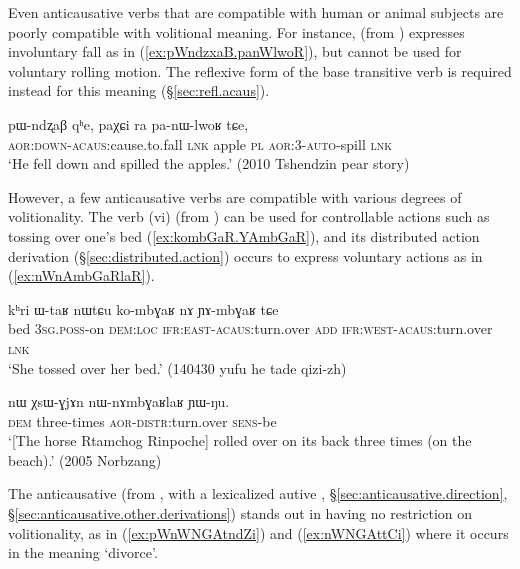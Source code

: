 Even anticausative verbs that are compatible with human or animal subjects are poorly compatible with volitional meaning. For instance,  (from ) expresses involuntary fall as in (\ref{ex:pWndzxaB.panWlwoR}), but cannot be used for voluntary rolling motion. The reflexive form of the base transitive verb  is required instead for this meaning (§\ref{sec:refl.acaus}).

\begin{exe}
\ex \label{ex:pWndzxaB.panWlwoR}
\gll pɯ-ndʐaβ qʰe, paχɕi ra pa-nɯ-lwoʁ tɕe, \\
\textsc{aor}:\textsc{down}-\textsc{acaus}:cause.to.fall \textsc{lnk} apple \textsc{pl} \textsc{aor}:3\flobv{}-\textsc{auto}-spill \textsc{lnk} \\
\glt `He fell down and spilled the apples.' (2010 Tshendzin pear story)
\end{exe} 

However, a few anticausative verbs are compatible with various degrees of volitionality. The verb  (vi) (from ) can be used for controllable actions such as tossing over one's bed (\ref{ex:kombGaR.YAmbGaR}), and its distributed action derivation (§\ref{sec:distributed.action})  occurs to express voluntary actions as in (\ref{ex:nWnAmbGaRlaR}).

\begin{exe}
\ex \label{ex:kombGaR.YAmbGaR}
\gll kʰri ɯ-taʁ nɯtɕu ko-mbɣaʁ nɤ ɲɤ-mbɣaʁ tɕe \\
bed \textsc{3sg}.\textsc{poss}-on \textsc{dem}:\textsc{loc} \textsc{ifr}:\textsc{east}-\textsc{acaus}:turn.over \textsc{add} \textsc{ifr}:\textsc{west}-\textsc{acaus}:turn.over \textsc{lnk} \\
\glt `She tossed over her bed.' (140430 yufu he tade qizi-zh) 
\end{exe} 

 \begin{exe}
\ex \label{ex:nWnAmbGaRlaR}
\gll  nɯ χsɯ-ɣjɤn nɯ-nɤmbɣaʁlaʁ ɲɯ-ŋu. \\ 
\textsc{dem} three-times  \textsc{aor}-\textsc{distr}:turn.over  \textsc{sens}-be \\
\glt  `[The horse Rtamchog Rinpoche] rolled over on its back three times (on the beach).' (2005 Norbzang)
\end{exe}

The anticausative  (from , with a lexicalized autive , §\ref{sec:anticausative.direction}, §\ref{sec:anticausative.other.derivations}) stands out in having no restriction on volitionality, as in (\ref{ex:pWnWNGAtndZi}) and (\ref{ex:nWNGAttCi}) where it occurs in the meaning `divorce'. 

